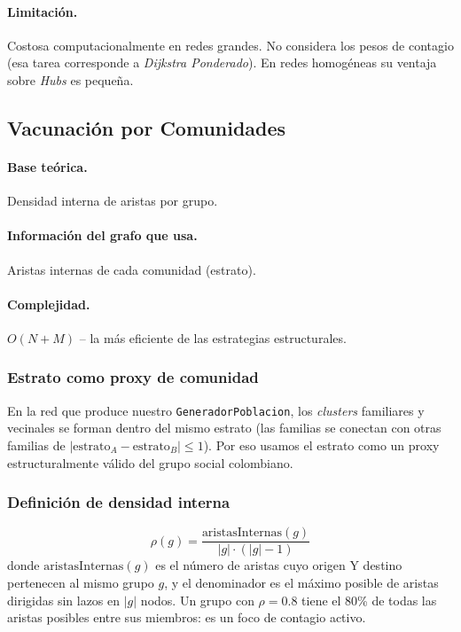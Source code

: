 \documentclass[spanish,notitlepage,letterpaper, 12pt]{article}
\begin{document}
\paragraph{Limitaci\'on.} Costosa computacionalmente en redes grandes. No considera los pesos de contagio (esa tarea corresponde a \textit{Dijkstra Ponderado}). En redes homog\'eneas su ventaja sobre \textit{Hubs} es peque\~na.

\subsection{Vacunaci\'on por Comunidades}

\paragraph{Base te\'orica.} Densidad interna de aristas por grupo.

\paragraph{Informaci\'on del grafo que usa.} Aristas internas de cada comunidad (estrato).

\paragraph{Complejidad.} $O(N + M)$ -- la m\'as eficiente de las estrategias estructurales.

\subsubsection{Estrato como proxy de comunidad}

En la red que produce nuestro \texttt{GeneradorPoblacion}, los \textit{clusters} familiares y vecinales se forman dentro del mismo estrato (las familias se conectan con otras familias de $|\text{estrato}_A - \text{estrato}_B| \leq 1$). Por eso usamos el estrato como un proxy estructuralmente v\'alido del grupo social colombiano.

\subsubsection{Definici\'on de densidad interna}

\begin{equation}
\rho(g) = \frac{\text{aristasInternas}(g)}{|g| \cdot (|g| - 1)}
\end{equation}
donde $\text{aristasInternas}(g)$ es el n\'umero de aristas cuyo origen Y destino pertenecen al mismo grupo $g$, y el denominador es el m\'aximo posible de aristas dirigidas sin lazos en $|g|$ nodos. Un grupo con $\rho = 0.8$ tiene el 80\% de todas las aristas posibles entre sus miembros: es un foco de contagio activo.
\end{document}
